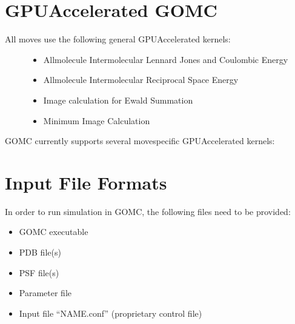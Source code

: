 \documentclass[letterpaper,10pt,english]{sphinxmanual}
\begin{document}
\chapter{GPU\sphinxhyphen{}Accelerated GOMC}
\label{\detokenize{gpu_acceleration:gpu-accelerated-gomc}}\label{\detokenize{gpu_acceleration::doc}}\begin{description}
\item[{All moves use the following general GPU\sphinxhyphen{}Accelerated kernels:}] \leavevmode\begin{itemize}
\item {} 
\sphinxAtStartPar
All\sphinxhyphen{}molecule Intermolecular Lennard Jones and Coulombic Energy

\item {} 
\sphinxAtStartPar
All\sphinxhyphen{}molecule Intermolecular Reciprocal Space Energy

\item {} 
\sphinxAtStartPar
Image calculation for Ewald Summation

\item {} 
\sphinxAtStartPar
Minimum Image Calculation

\end{itemize}

\item[{GOMC currently supports several move\sphinxhyphen{}specific GPU\sphinxhyphen{}Accelerated kernels:}] \leavevmode
\end{description}


\chapter{Input File Formats}
\label{\detokenize{input_file:input-file-formats}}\label{\detokenize{input_file::doc}}
\sphinxAtStartPar
In order to run simulation in GOMC, the following files need to be provided:
\begin{itemize}
\item {} 
\sphinxAtStartPar
GOMC executable

\item {} 
\sphinxAtStartPar
PDB file(s)

\item {} 
\sphinxAtStartPar
PSF file(s)

\item {} 
\sphinxAtStartPar
Parameter file

\item {} 
\sphinxAtStartPar
Input file “NAME.conf” (proprietary control file)

\end{itemize}
\end{document}

